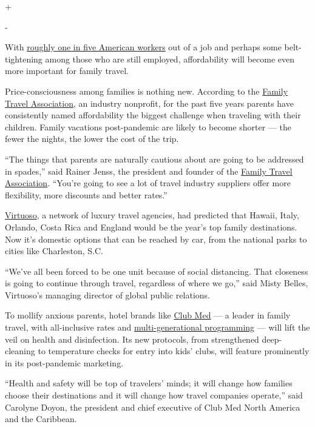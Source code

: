 +

-

With
\href{https://www.nytimes3xbfgragh.onion/2020/04/30/business/economy/coronavirus-unemployment-claims.html}{roughly
one in five American workers} out of a job and perhaps some
belt-tightening among those who are still employed, affordability will
become even more important for family travel.

Price-consciousness among families is nothing new. According to the
\href{https://familytravel.org/}{Family Travel Association}, an industry
nonprofit, for the past five years parents have consistently named
affordability the biggest challenge when traveling with their children.
Family vacations post-pandemic are likely to become shorter --- the
fewer the nights, the lower the cost of the trip.

``The things that parents are naturally cautious about are going to be
addressed in spades,'' said Rainer Jenss, the president and founder of
the \href{https://familytravel.org/}{Family Travel Association}.
``You're going to see a lot of travel industry suppliers offer more
flexibility, more discounts and better rates.''

\href{https://www.virtuoso.com/}{Virtuoso}, a network of luxury travel
agencies, had predicted that Hawaii, Italy, Orlando, Costa Rica and
England would be the year's top family destinations. Now it's domestic
options that can be reached by car, from the national parks to cities
like Charleston, S.C.

``We've all been forced to be one unit because of social distancing.
That closeness is going to continue through travel, regardless of where
we go,'' said Misty Belles, Virtuoso's managing director of global
public relations.

To mollify anxious parents, hotel brands like
\href{http://clubmed.com/}{Club Med} --- a leader in family travel, with
all-inclusive rates and
\href{https://www.clubmed.us/l/all-inclusive-resorts-for-families\#AmazingFamily}{multi-generational
programming} --- will lift the veil on health and disinfection. Its new
protocols, from strengthened deep-cleaning to temperature checks for
entry into kids' clubs, will feature prominently in its post-pandemic
marketing.

``Health and safety will be top of travelers' minds; it will change how
families choose their destinations and it will change how travel
companies operate,'' said Carolyne Doyon, the president and chief
executive of Club Med North America and the Caribbean.

